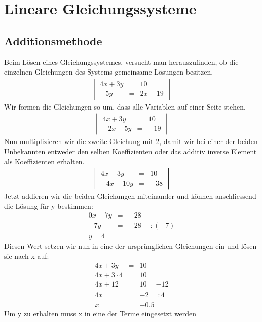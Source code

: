 
\chapter{Lineare Gleichungssysteme}
\section{Additionsmethode}
Beim Lösen eines Gleichungssystemes, versucht man herauszufinden, ob die einzelnen Gleichungen des Systems gemeinsame Lösungen besitzen. 
\begin{eqnarray*}
\begin{vmatrix} 4x + 3y &=& 10 \\ -5y &=& 2x - 19\end{vmatrix}
\end{eqnarray*}
Wir formen die Gleichungen so um, dass alle Variablen auf einer Seite stehen.
\begin{eqnarray*}
\begin{vmatrix} 4x + 3y &=& 10 \\ -2x -5y &=& - 19\end{vmatrix}
\end{eqnarray*}
Nun multiplizieren wir die zweite Gleichung mit 2, damit wir bei einer der beiden Unbekannten entweder den selben Koeffizienten oder das additiv inverse Element als Koeffizienten erhalten.
\begin{eqnarray*}
\begin{vmatrix} 4x + 3y &=& 10 \\ -4x -10y &=& - 38\end{vmatrix}
\end{eqnarray*}
Jetzt addieren wir die beiden Gleichungen miteinander und können anschliessend die Lösung für y bestimmen:
\begin{eqnarray*}
0x - 7y &=& -28\\
-7y &=& -28 \quad|: (-7)\\
y = 4
\end{eqnarray*}
Diesen Wert setzen wir nun in eine der ursprünglichen Gleichungen ein und lösen sie nach x auf:
\begin{eqnarray*}
4x+3y &=& 10\\
4x + 3 \cdot 4 &=& 10\\
4x + 12 &=& 10 \quad| -12\\
4x &=& -2 \quad |:4\\
x &=& -0.5
\end{eqnarray*}
Um y zu erhalten muss x in eine der Terme eingesetzt werden
